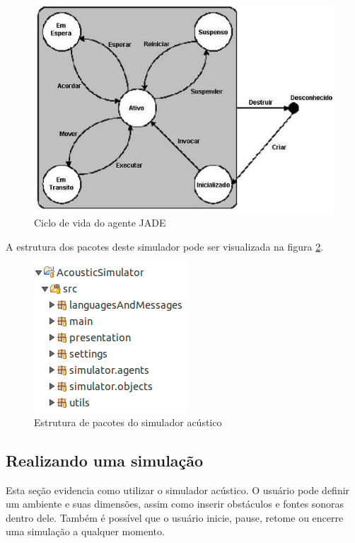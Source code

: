 \begin{figure}[!htb]
\centering
\includegraphics[scale=0.7]{figuras/ciclo_de_vida_agente_jade}
\caption{Ciclo de vida do agente JADE \cite{leonardo}}
\label{ciclo_jade}
\end{figure}

A estrutura dos pacotes deste simulador pode ser visualizada na figura \ref{pacotes}.

\begin{figure}[!htb]
\centering
\includegraphics[scale=0.8]{figuras/pacotes}
\caption{Estrutura de pacotes do simulador acústico}
\label{pacotes}
\end{figure}

\pagebreak

\subsection{Realizando uma simulação}

Esta seção evidencia como utilizar o simulador acústico. O usuário pode definir um ambiente e suas dimensões, assim como inserir obstáculos e fontes sonoras dentro dele. Também é possível que o usuário inicie, pause, retome ou encerre uma simulação a qualquer momento.

